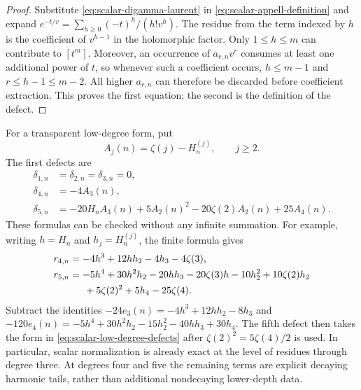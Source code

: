 \documentclass[11pt,a4paper]{article}
\numberwithin{equation}{section}
\theoremstyle{definition}
\begin{document}
\begin{proof}
Substitute \eqref{eq:scalar-digamma-laurent} in
\eqref{eq:scalar-appell-definition} and expand
$e^{-t/v}=\sum_{h\geq0}(-t)^h/(h!v^h)$.  The residue from
the term indexed by $h$ is the coefficient of $v^{h-1}$ in
the holomorphic factor.  Only $1\leq h\leq m$ can contribute
to $[t^m]$.  Moreover, an occurrence of $a_{r,n}v^r$ consumes
at least one additional power of $t$, so whenever such a coefficient
occurs, $h\leq m-1$ and $r\leq h-1\leq m-2$.
All higher $a_{r,n}$ can therefore
be discarded before coefficient extraction.  This proves the
first equation; the second is the definition of the defect.
\end{proof}

For a transparent low-degree form, put
\begin{equation}
 A_j(n)=\zeta(j)-H_n^{(j)},\qquad j\geq2.
 \label{eq:scalar-harmonic-tails}
\end{equation}
The first defects are
\begin{equation}
 \begin{aligned}
 \delta_{1,n}&=\delta_{2,n}=\delta_{3,n}=0,\\
 \delta_{4,n}&=-4A_3(n),\\
 \delta_{5,n}&=-20H_nA_3(n)+5A_2(n)^2
                 -20\zeta(2)A_2(n)+25A_4(n).
 \end{aligned}
 \label{eq:scalar-low-degree-defects}
\end{equation}
These formulas can be checked without any infinite summation.
For example, writing $h=H_n$ and $h_j=H_n^{(j)}$, the finite
formula gives
\begin{equation}
 \begin{aligned}
 r_{4,n}&=-4h^3+12hh_2-4h_3-4\zeta(3),\\
 r_{5,n}&=-5h^4+30h^2h_2-20hh_3-20\zeta(3)h
           -10h_2^2+10\zeta(2)h_2\\
        &\hspace{1.5em}+5\zeta(2)^2+5h_4-25\zeta(4).
 \end{aligned}
 \label{eq:scalar-fourth-fifth-residues}
\end{equation}
Subtract the identities
$-24e_3(n)=-4h^3+12hh_2-8h_3$ and
$-120e_4(n)=-5h^4+30h^2h_2-15h_2^2-40hh_3+30h_4$.
The fifth defect then takes the form in
\eqref{eq:scalar-low-degree-defects} after
$\zeta(2)^2=5\zeta(4)/2$ is used.  In particular, scalar
normalization is already exact at the level of residues through
degree three.  At degrees four and five the remaining terms are
explicit decaying harmonic tails, rather than additional
nondecaying lower-depth data.
\end{document}
